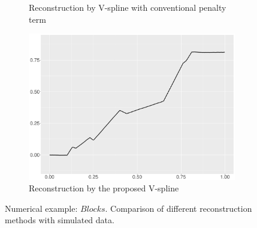 \begin{figure}
\begin{subfigure}{0.45\textwidth}
    \caption{Reconstruction by V-spline with conventional penalty term}
    \end{subfigure}
    \begin{subfigure}{0.45\textwidth}
    \centering
    \includegraphics[width=\linewidth,height=0.45\textwidth]{Chapters/02TractorSplineTheory/plot/ggplot/ggBlocksTractor.pdf}
    \caption{Reconstruction by the proposed V-spline}
    \end{subfigure}
\caption{Numerical example: $\textit{Blocks}$. Comparison of different reconstruction methods with simulated data.}\label{num1}
 \end{figure}

%


